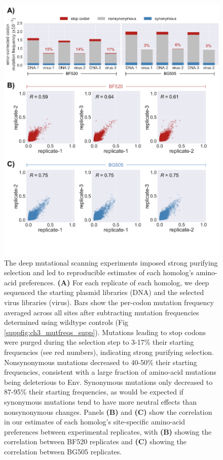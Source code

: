 \documentclass[9pt,lineno]{elife}
\begin{document}
\begin{figure}
\centerline{\includegraphics[width=5in]{figures/mutfreqs/mutfreqs}}
\caption{\label{fig:mutfreqs}
The deep mutational scanning experiments imposed strong purifying selection and led to reproducible estimates of each homolog's amino-acid preferences.
{\bf(A)} For each replicate of each homolog, we deep sequenced the starting plasmid libraries (DNA) and the selected virus libraries (virus).
Bars show the per-codon mutation frequency averaged across all sites after subtracting mutation frequencies determined using wildtype controls (Fig \ref{suppfig:ch3_mutfreqs_supp}).
Mutations leading to stop codons were purged during the selection step to 3-17\% their starting frequencies (see red numbers), indicating strong purifying selection.
Nonsynonymous mutations decreased to 40-50\% their starting frequencies, consistent with a large fraction of amino-acid mutations being deleterious to Env.
Synonymous mutations only decreased to 87-95\% their starting frequencies, as would be expected if synonymous mutations tend to have more neutral effects than nonsynonymous changes.
Panels {\bf(B)} and {\bf(C)} show the correlation in our estimates of each homolog's site-specific amino-acid preferences between experimental replicates, with {\bf(B)} showing the correlation between BF520 replicates and {\bf(C)} showing the correlation between BG505 replicates.
}
\end{figure}
\end{document}
